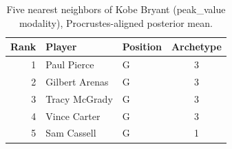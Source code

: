 \begin{table}[htbp]
  \centering\small
  \begin{tabular}{rllc}
    \toprule
    Rank & Player & Position & Archetype \\
    \midrule
    1 & Paul Pierce & G & 3 \\
    2 & Gilbert Arenas & G & 3 \\
    3 & Tracy McGrady & G & 3 \\
    4 & Vince Carter & G & 3 \\
    5 & Sam Cassell & G & 1 \\
    \bottomrule
  \end{tabular}
  \caption{Five nearest neighbors of Kobe Bryant (peak_value modality), Procrustes-aligned posterior mean.}
  \label{tab:Kobe_Bryant_neighbors_peak_value}
\end{table}

